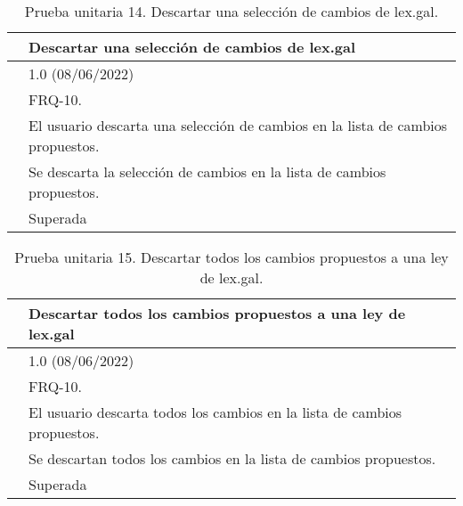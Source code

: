 \begin{table}[H]
\begin{center}
\begin{tabular}{|p{3cm}|p{10cm}|} \hline
\centering {\bf PU-14} & Descartar una selección de cambios de lex.gal  \\ \hline\hline
\centering {\bf Versión} & 1.0 (08/06/2022) \\ \hline
\centering {\bf Dependencias} & FRQ-10. \\ \hline
\centering {\bf Descripción} &  El usuario descarta una selección de cambios en la lista de cambios propuestos. \\ \hline
\centering {\bf Criterio de aceptación} & Se descarta la selección de cambios en la lista de cambios propuestos. \\ \hline
\centering {\bf Estado} & Superada \\ \hline
\end{tabular}
\caption{Prueba unitaria 14. Descartar una selección de cambios de lex.gal.}
\label{enlacePU14}
\end{center}
\end{table}

\begin{table}[H]
\begin{center}
\begin{tabular}{|p{3cm}|p{10cm}|} \hline
\centering {\bf PU-15} & Descartar todos los cambios propuestos a una ley de lex.gal  \\ \hline\hline
\centering {\bf Versión} & 1.0 (08/06/2022) \\ \hline
\centering {\bf Dependencias} & FRQ-10. \\ \hline
\centering {\bf Descripción} &  El usuario descarta todos los cambios en la lista de cambios propuestos. \\ \hline
\centering {\bf Criterio de aceptación} & Se descartan todos los cambios en la lista de cambios propuestos. \\ \hline
\centering {\bf Estado} & Superada \\ \hline
\end{tabular}
\caption{Prueba unitaria 15. Descartar todos los cambios propuestos a una ley de lex.gal.}
\label{enlacePU15}
\end{center}
\end{table}

